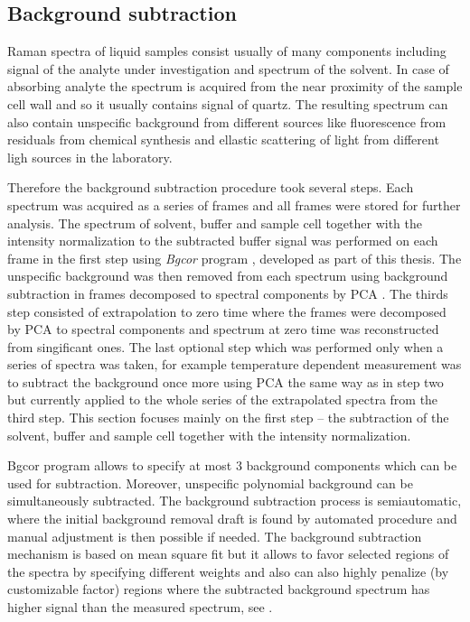 \subsection{Background subtraction}
\label{background}

Raman spectra of liquid samples consist usually of many components including
signal of the analyte under investigation and spectrum of the solvent.
In case of absorbing analyte the spectrum
is acquired from the near proximity of the sample cell wall and so it
usually contains signal of quartz.
The resulting spectrum can also contain unspecific background from different
sources like fluorescence from residuals from chemical synthesis and ellastic
scattering of light from different ligh sources in the laboratory.

Therefore the background subtraction procedure took several steps.
Each spectrum was acquired as a series of frames and all frames were stored
for further analysis.
The spectrum of solvent, buffer and sample cell together with the intensity
normalization to the subtracted buffer signal was performed on each frame in
the first step using \emph{Bgcor} program
\parencite{Bgcor2017},
developed as part of this thesis. The unspecific background was then removed
from each spectrum using background subtraction in frames decomposed to
spectral components by PCA
\parencite{Palacky2011}.
The thirds step consisted of extrapolation to zero time where the frames
were decomposed by PCA to spectral components and spectrum at zero time was
reconstructed from singificant ones.
The last optional step which was performed only when a series of spectra was
taken, for example temperature dependent measurement was to subtract the
background once more using PCA the same way as in step two but currently
applied to the whole series of the extrapolated spectra from the third step.
This section focuses mainly on the first step -- the subtraction of the
solvent, buffer and sample cell together with the intensity normalization.

Bgcor program allows to specify at most 3 background components which can be
used for subtraction. Moreover, unspecific polynomial background can be
simultaneously subtracted.
The background subtraction process is semiautomatic, where the initial
background removal draft is found by automated procedure and manual adjustment
is then possible if needed.
The background subtraction mechanism is based on mean square fit but it allows
to favor selected regions of the spectra by specifying different weights and
also can also highly penalize (by customizable factor) regions where the
subtracted background spectrum has higher signal than the measured spectrum,
see
.

